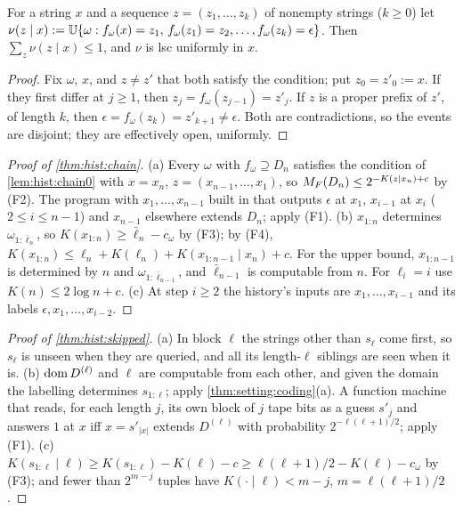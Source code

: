 \begin{lemma}\label{lem:hist:chain0}
For a string $x$ and a sequence $z=(z_1,\dots,z_k)$ of nonempty strings ($k\ge0$) let $\nu(z\mid x):=\mathbb{U}\{\omega:f_\omega(x)=z_1,\,f_\omega(z_1)=z_2,\dots,f_\omega(z_k)=\epsilon\}$. Then $\sum_z\nu(z\mid x)\le1$, and $\nu$ is lsc uniformly in $x$.
\end{lemma}

\begin{proof}
Fix $\omega$, $x$, and $z\ne z'$ that both satisfy the condition; put $z_0=z'_0:=x$. If they first differ at $j\ge1$, then $z_j=f_\omega(z_{j-1})=z'_j$. If $z$ is a proper prefix of $z'$, of length $k$, then $\epsilon=f_\omega(z_k)=z'_{k+1}\ne\epsilon$. Both are contradictions, so the events are disjoint; they are effectively open, uniformly.
\end{proof}

\begin{proof}[Proof of \cref{thm:hist:chain}]
(a) Every $\omega$ with $f_\omega\supseteq D_n$ satisfies the condition of \cref{lem:hist:chain0} with $x=x_n$, $z=(x_{n-1},\dots,x_1)$, so $M_{F}(D_n)\le2^{-K(z\mid x_n)+c}$ by (F2). The program with $x_1,\dots,x_{n-1}$ built in that outputs $\epsilon$ at $x_1$, $x_{i-1}$ at $x_i$ ($2\le i\le n-1$) and $x_{n-1}$ elsewhere extends $D_n$; apply (F1).
(b) $x_{1:n}$ determines $\omega_{1:\bar\ell_n}$, so $K(x_{1:n})\ge\bar\ell_n-c_\omega$ by (F3); by (F4), $K(x_{1:n})\le\ell_n+K(\ell_n)+K(x_{1:n-1}\mid x_n)+c$. For the upper bound, $x_{1:n-1}$ is determined by $n$ and $\omega_{1:\bar\ell_{n-1}}$, and $\bar\ell_{n-1}$ is computable from $n$. For $\ell_i=i$ use $K(n)\le2\log n+c$.
(c) At step $i\ge2$ the history's inputs are $x_1,\dots,x_{i-1}$ and its labels $\epsilon,x_1,\dots,x_{i-2}$.
\end{proof}

\begin{proof}[Proof of \cref{thm:hist:skipped}]
(a) In block $\ell$ the strings other than $s_\ell$ come first, so $s_\ell$ is unseen when they are queried, and all its length-$\ell$ siblings are seen when it is. (b) $\operatorname{dom} D^{(\ell)}$ and $\ell$ are computable from each other, and given the domain the labelling determines $s_{1:\ell}$; apply \cref{thm:setting:coding}(a). A function machine that reads, for each length $j$, its own block of $j$ tape bits as a guess $s'_j$ and answers $1$ at $x$ iff $x=s'_{|x|}$ extends $D^{(\ell)}$ with probability $2^{-\ell(\ell+1)/2}$; apply (F1). (c) $K(s_{1:\ell}\mid\ell)\ge K(s_{1:\ell})-K(\ell)-c\ge\ell(\ell+1)/2-K(\ell)-c_\omega$ by (F3); and fewer than $2^{m-j}$ tuples have $K(\cdot\mid\ell)<m-j$, $m=\ell(\ell+1)/2$.
\end{proof}


